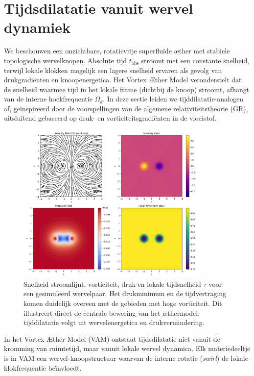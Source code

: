 \section{Tijdsdilatatie vanuit wervel dynamiek}

We beschouwen een onzichtbare, rotatievrije superfluïde æther met stabiele topologische wervelknopen. Absolute tijd $t_{\text{abs}}$ stroomt met een constante snelheid, terwijl lokale klokken mogelijk een lagere snelheid ervaren als gevolg van drukgradiënten en knoopenergetica. Het Vortex Æther Model veronderstelt dat de snelheid waarmee tijd in het lokale frame (dichtbij de knoop) stroomt, afhangt van de interne hoekfrequentie $\Omega_k$. In deze sectie leiden we tijddilatatie-analogen af, geïnspireerd door de voorspellingen van de algemene relativiteitstheorie (GR), uitsluitend gebaseerd op druk- en vorticiteitsgradiënten in de vloeistof.

\begin{figure}[htbp]
\centering
\includegraphics[width=0.85\textwidth]{streamlinesDiPole}
\caption{Snelheid stroomlijnt, vorticiteit, druk en lokale tijdsnelheid $\tau$ voor een gesimuleerd wervelpaar. Het drukminimum en de tijdvertraging komen duidelijk overeen met de gebieden met hoge vorticiteit. Dit illustreert direct de centrale bewering van het æthermodel: tijddilatatie volgt uit wervelenergetica en drukvermindering.}
\label{fig:vortexfields}
\end{figure}

In het Vortex Æther Model (VAM) ontstaat tijdsdilatatie niet vanuit de kromming van ruimtetijd, maar vanuit lokale wervel dynamica. Elk materiedeeltje is in VAM een wervel-knoopstructuur waarvan de interne rotatie (\textit{swirl}) de lokale klokfrequentie beïnvloedt.

